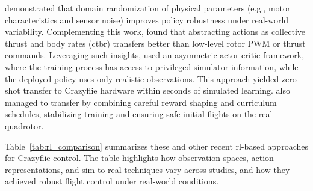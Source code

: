 \cite{molchanov_sim--multi-real_2019} demonstrated that domain randomization of physical parameters (e.g., motor characteristics and sensor noise) improves policy robustness under real-world variability. Complementing this work, \cite{kaufmann_benchmark_2022} found that abstracting actions as collective thrust and body rates (\gls{ctbr}) transfers better than low-level rotor PWM or thrust commands. Leveraging such insights, \cite{eschmann_learning_2024} used an asymmetric actor-critic framework, where the training process has access to privileged simulator information, while the deployed policy uses only realistic observations. This approach yielded zero-shot transfer to Crazyflie hardware within seconds of simulated learning. \cite{chen_what_2024} also managed to transfer by combining careful reward shaping and curriculum schedules, stabilizing training and ensuring safe initial flights on the real quadrotor.

Table~\ref{tab:rl_comparison} summarizes these and other recent \gls{rl}-based approaches for Crazyflie control. The table highlights how observation spaces, action representations, and sim-to-real techniques vary across studies, and how they achieved robust flight control under real-world conditions.

